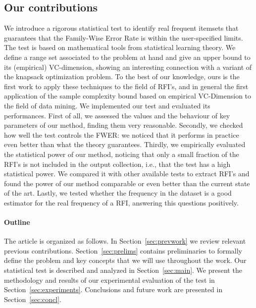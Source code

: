 \subsection{Our contributions}
We introduce a rigorous statistical test to identify real frequent itemsets that
guarantees that the Family-Wise Error Rate is within the user-specified limits. 
The test is based on mathematical tools from statistical learning
theory. We define a range set associated to the problem at hand and give an
upper bound to its (empirical) VC-dimension, showing an interesting connection
with a variant of the knapsack optimization problem.
To the best of our knowledge, ours is the first work to apply these
techniques to the field of RFI's, and in general the first application of the sample complexity
bound based on empirical VC-Dimension to the field of data mining. We
implemented our test and evaluated its performances. First of all, we assessed
the values and the behaviour of key parameters of our method, finding them very
reasonable. Secondly, we checked how well the test controls the FWER: we
noticed that it performs in practice even better than what the theory
guarantees. Thirdly, we empirically evaluated
the statistical power of our method, noticing that only a small fraction of the
RFI's is not included in the output collection, i.e., that the test has a high
statistical power. We compared it with other available tests to extract RFI's
and found the power of our method comparable or even better than the current
state of the art. Lastly, we tested whether the frequency in the dataset is a
good estimator for the real frequency of a RFI, answering this questions
positively.

\paragraph*{Outline} The article is organized as follows. In
Section~\ref{sec:prevwork} we review relevant previous contributions.
Section~\ref{sec:prelims} contains preliminaries to formally define the problem
and key concepts that we will use throughout the work. Our statistical test is
described and analyzed in Section~\ref{sec:main}. We present the methodology and
results of our experimental evaluation of the test in
Section~\ref{sec:experiments}. Conclusions and future work are presented in
Section~\ref{sec:concl}.

